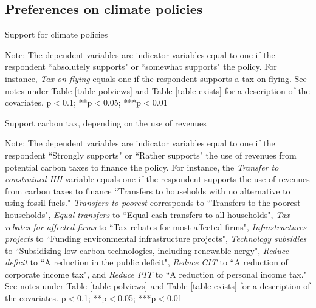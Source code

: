 \documentclass{article}
\begin{document}
\clearpage
\subsection{Preferences on climate policies}



\begin{table}[h!]
	\caption{Support for climate policies}
	\begin{center}
		\scalebox{0.7}{}
	\end{center}
	{\footnotesize Note: The dependent variables are indicator variables equal to one if the respondent ``absolutely supports" or ``somewhat supports" the policy. For instance, \textit{Tax on flying} equals one if the respondent supports a tax on flying. See notes under Table \ref{table polviews} and Table \ref{table exists} for a description of the covariates.
	\newline *p$<$0.1; **p$<$0.05; ***p$<$0.01}
\end{table}	

\begin{landscape}
	\begin{table}[h!]
	\caption{Support carbon tax, depending on the use of revenues}
	\begin{center}
		\scalebox{0.55}{}
	\end{center}
	{\footnotesize Note: The dependent variables are indicator variables equal to one if the respondent ``Strongly supports" or ``Rather supports" the use of revenues from potential carbon taxes to finance the policy. For instance, the \textit{Transfer to constrained HH} variable equals one if the respondent supports the use of revenues from carbon taxes to finance ``Transfers to households with no alternative to using fossil fuels." \textit{Transfers to poorest} corresponds to ``Transfers to the poorest households", \textit{Equal transfers} to ``Equal cash transfers to all households", \textit{Tax rebates for affected firms} to ``Tax rebates for most affected firms", \textit{Infrastructures projects} to ``Funding environmental infrastructure projects", \textit{Technology subsidies} to ``Subsidizing low-carbon technologies, including renewable nergy", \textit{Reduce deficit} to ``A reduction in the public deficit", \textit{Reduce CIT} to ``A reduction of corporate income tax", and \textit{Reduce PIT} to ``A reduction of personal income tax." See notes under Table \ref{table polviews} and Table \ref{table exists} for a description of the covariates.
	\newline *p$<$0.1; **p$<$0.05; ***p$<$0.01}
\end{table}	
\end{landscape}
\end{document}
